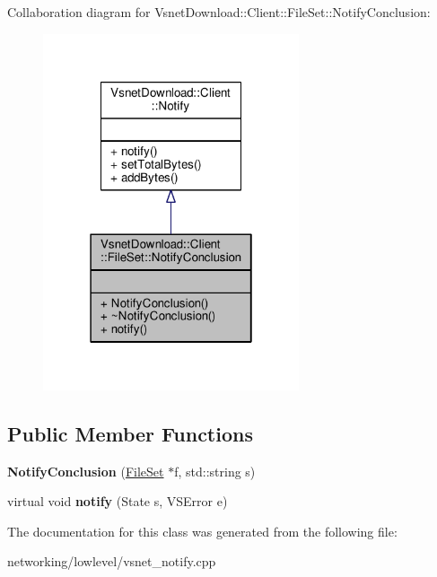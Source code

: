 Collaboration diagram for Vsnet\+Download\+:\+:Client\+:\+:File\+Set\+:\+:Notify\+Conclusion\+:
\nopagebreak
\begin{figure}[H]
\begin{center}
\leavevmode
\includegraphics[width=214pt]{d1/d80/classVsnetDownload_1_1Client_1_1FileSet_1_1NotifyConclusion__coll__graph}
\end{center}
\end{figure}
\subsection*{Public Member Functions}
\begin{DoxyCompactItemize}
\item 
{\bfseries Notify\+Conclusion} (\hyperlink{classVsnetDownload_1_1Client_1_1FileSet}{File\+Set} $\ast$f, std\+::string s)\hypertarget{classVsnetDownload_1_1Client_1_1FileSet_1_1NotifyConclusion_aa70181cb73a68a6a518645c384a842ec}{}\label{classVsnetDownload_1_1Client_1_1FileSet_1_1NotifyConclusion_aa70181cb73a68a6a518645c384a842ec}

\item 
virtual void {\bfseries notify} (State s, V\+S\+Error e)\hypertarget{classVsnetDownload_1_1Client_1_1FileSet_1_1NotifyConclusion_af97402d0a4cedba9a0e1e4b11ea9f15e}{}\label{classVsnetDownload_1_1Client_1_1FileSet_1_1NotifyConclusion_af97402d0a4cedba9a0e1e4b11ea9f15e}

\end{DoxyCompactItemize}


The documentation for this class was generated from the following file\+:\begin{DoxyCompactItemize}
\item 
networking/lowlevel/vsnet\+\_\+notify.\+cpp\end{DoxyCompactItemize}
